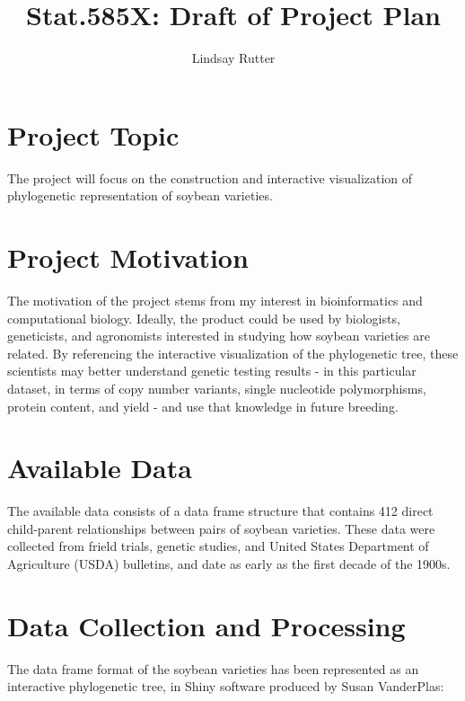 \documentclass{article}\usepackage[]{graphicx}\usepackage[]{color}
\begin{document}
\author{Lindsay Rutter}
\title{Stat.585X: Draft of Project Plan}

\maketitle




\section*{Project Topic}

The project will focus on the construction and interactive visualization of phylogenetic representation of soybean varieties.

\section*{Project Motivation}

The motivation of the project stems from my interest in bioinformatics and computational biology. Ideally, the product could be used by biologists, geneticists, and agronomists interested in studying how soybean varieties are related. By referencing the interactive visualization of the phylogenetic tree, these scientists may better understand genetic testing results - in this particular dataset, in terms of copy number variants, single nucleotide polymorphisms, protein content, and yield - and use that knowledge in future breeding.

\section*{Available Data}

The available data consists of a data frame structure that contains 412 direct child-parent relationships between pairs of soybean varieties. These data were collected from frield trials, genetic studies, and United States Department of Agriculture (USDA) bulletins, and date as early as the first decade of the 1900s.

\section*{Data Collection and Processing}

The data frame format of the soybean varieties has been represented as an interactive phylogenetic tree, in Shiny software produced by Susan VanderPlas:\\
\end{document}
